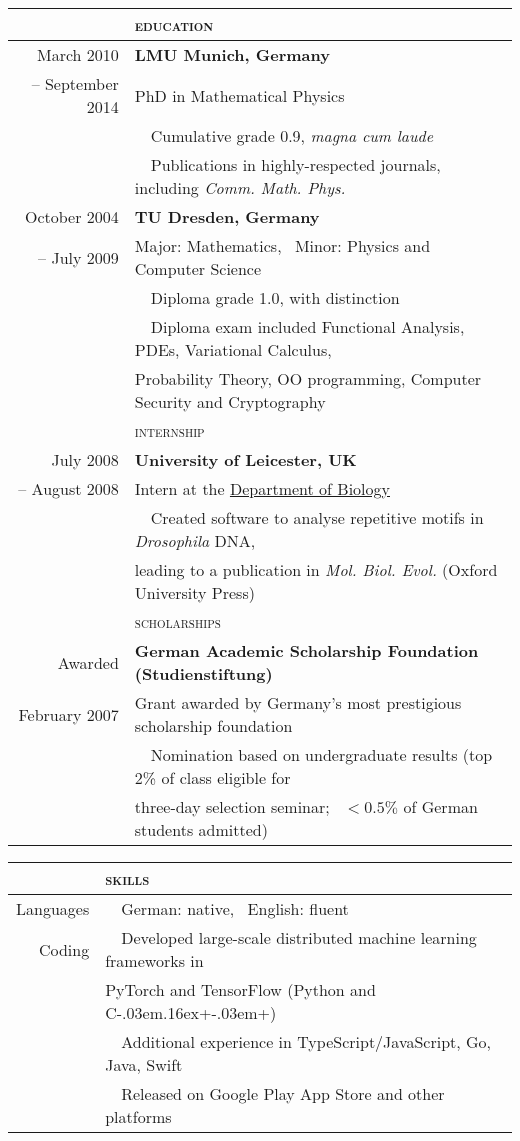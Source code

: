 \documentclass[11pt,english,a4paper]{memoir}
\newcommand{\red}{\color{Maroon}}
\newcommand{\header}[1]{%
  \addlinespace[2ex]
  & \large{\red\textsc{\MakeLowercase{#1}}} \tabularnewline
  \midrule}
\newcommand{\n}{\tabularnewline}
\newcommand{\bull}{\Pisymbol{MinionPro-Extra}{146}~~}
\newcommand{\nobull}{\phantom{\bull}}
\newcommand{\Cpp}{C\kern-.03em\raise.16ex\hbox{\small{+\kern-.03em+}}}
\begin{document}
\begin{center}
\begin{tabular}{rl}

  \n
  \header{Education}
  March 2010        & \textbf{LMU Munich, Germany} \n
  -- September 2014 & PhD in Mathematical Physics \n
  & \bull Cumulative grade 0.9, \textit{magna cum laude} \n
  & \bull Publications in highly-respected journals, including \textit{Comm. Math. Phys.}

  \n \addlinespace
  October 2004  & \textbf{TU Dresden, Germany} \n
  -- July 2009  & Major: Mathematics, \ Minor: Physics and Computer Science \n
  & \bull Diploma grade 1.0, with distinction \n
  & \bull Diploma exam included Functional Analysis, PDEs, Variational Calculus, \\
  & \nobull Probability Theory, OO programming, Computer Security and Cryptography


  \n
  \header{Internship}
  July 2008       & \textbf{University of Leicester, UK} \n
  -- August 2008  & Intern at the \href{http://www.le.ac.uk/biology/phh4/}{Department of Biology} \n
  & \bull Created software to analyse repetitive motifs in
  \textit{Drosophila} DNA, \\
  & \nobull leading to a publication in \textit{Mol. Biol. Evol.} (Oxford University Press)
  \n
  \header{Scholarships}
  Awarded & \textbf{German Academic Scholarship Foundation (Studienstiftung)} \n
  February 2007 & Grant awarded by Germany's most prestigious scholarship foundation
  \n
  & \bull Nomination based on undergraduate results (top 2\% of class
  eligible for \\
  & \nobull three-day selection seminar; \ $< 0.5\%$ of German students admitted)
\end{tabular}

\begin{tabular}{rl}
  \header{Skills}
  Languages & \bull German: native, \ English: fluent \n \addlinespace

  Coding
  & \bull Developed large-scale distributed machine learning frameworks in \n
  & \nobull PyTorch and TensorFlow (Python and \Cpp) \n
  & \bull Additional experience in TypeScript/JavaScript, Go, Java, Swift \\
  & \bull Released on Google Play App Store and other platforms


\end{tabular}
\end{center}
\end{document}
